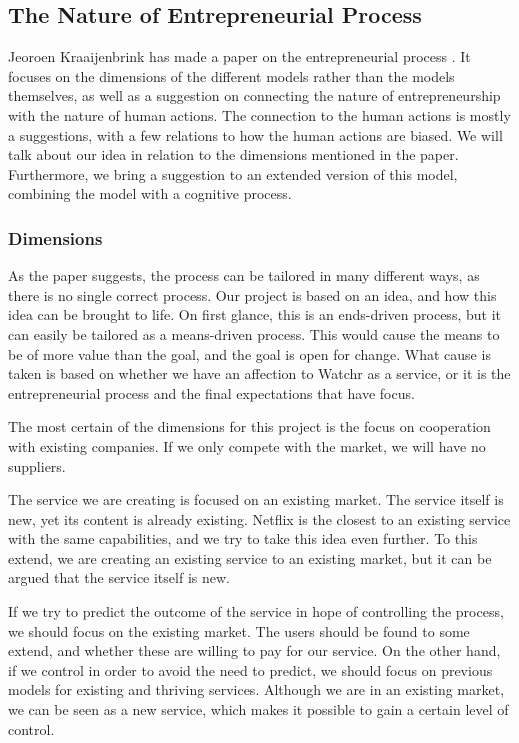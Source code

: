 \subsection{The Nature of Entrepreneurial Process}
\label{sec:gote}
Jeoroen Kraaijenbrink has made a paper on the entrepreneurial process \cite{kraaijenbrink}. It focuses on the dimensions of the different models rather than the models themselves, as well as a suggestion on connecting the nature of entrepreneurship with the nature of human actions. The connection to the human actions is mostly a suggestions, with a few relations to how the human actions are biased. We will talk about our idea in relation to the dimensions mentioned in the paper. Furthermore, we bring a suggestion to an extended version of this model, combining the model with a cognitive process.

\subsubsection*{Dimensions}
As the paper suggests, the process can be tailored in many different ways, as there is no single correct process. Our project is based on an idea, and how this idea can be brought to life. On first glance, this is an ends-driven process, but it can easily be tailored as a means-driven process. This would cause the means to be of more value than the goal, and the goal is open for change. What cause is taken is based on whether we have an affection to Watchr as a service, or it is the entrepreneurial process and the final expectations that have focus.

The most certain of the dimensions for this project is the focus on cooperation with existing companies. If we only compete with the market, we will have no suppliers.

The service we are creating is focused on an existing market. The service itself is new, yet its content is already existing. Netflix is the closest to an existing service with the same capabilities, and we try to take this idea even further. To this extend, we are creating an existing service to an existing market, but it can be argued that the service itself is new.

If we try to predict the outcome of the service in hope of controlling the process, we should focus on the existing market. The users should be found to some extend, and whether these are willing to pay for our service. On the other hand, if we control in order to avoid the need to predict, we should focus on previous models for existing and thriving services. Although we are in an existing market, we can be seen as a new service, which makes it possible to gain a certain level of control.

